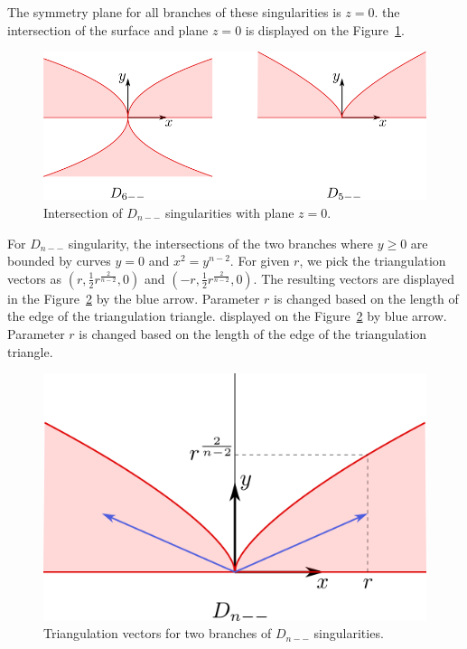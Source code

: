 The symmetry plane for all branches of these singularities is $z=0$.
the intersection of the surface and plane $z=0$ is displayed on the Figure~\ref{img:6}.

\begin{figure}
    \centerline{\includegraphics[scale=0.5]{images/img6}}
    \caption[Intersection of $D_{n--}$ singularities with plane $z=0$.]
    {Intersection of $D_{n--}$ singularities with plane $z=0$.}
    \label{img:6}
\end{figure}

For $D_{n--}$ singularity, the intersections of the two branches where
$y \geq 0$ are bounded by curves $y=0$ and $x^2=y^{n-2}$. For given $r$,
we pick the triangulation vectors as $(r, \frac{1}{2}r^{\frac{2}{n-2}}, 0)$
and $(-r, \frac{1}{2}r^{\frac{2}{n-2}}, 0)$. The resulting vectors are
displayed in the Figure~\ref{img:9} by the blue arrow. Parameter $r$ is changed based
on the length of the edge of the triangulation triangle.
displayed on the Figure~\ref{img:9} by blue arrow. Parameter $r$ is changed based
on the length of the edge of the triangulation triangle.

\begin{figure}
    \centerline{\includegraphics[scale=0.5]{images/img9}}
    \caption[Triangulation vectors for two branches of $D_{n--}$ singularities.]
    {Triangulation vectors for two branches of $D_{n--}$ singularities.}
    \label{img:9}
\end{figure}

